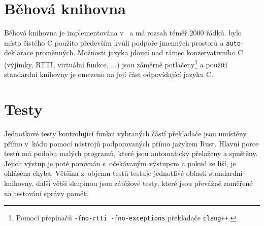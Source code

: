 \section{Běhová knihovna}

Běhová knihovna je implementována v~\Cplusplus{} a má rozsah téměř 2000 řádků.
\Cplusplus{} bylo místo čistého C použito především kvůli podpoře jmenných
prostorů a \texttt{auto}-deklarace proměnných. Možnosti jazyka jdoucí nad rámec
konzervativního C (výjimky, RTTI, virtuální funkce, ...) jsou záměrně
potlačeny\footnote{Pomocí přepínačů \texttt{-fno-rtti -fno-exceptions}
překladače \texttt{clang++}.} a použití standardní knihovny je omezeno na její
část odpovídající jazyku C.

\section{Testy}

Jednotkové testy kontrolující funkci vybraných částí překladače jsou umístěny
přímo v~kódu pomocí nástrojů podporovaných přímo jazykem Rust. Hlavní porce
testů má podobu malých programů, které jsou automaticky přeloženy a spuštěny.
Jejich výstup je poté porovnán s~očekávaným výstupem a pokud se liší, je
ohlášena chyba. Většina z~objemu testů testuje jednotlivé oblasti standardní
knihovny, další větši skupinou jsou zátěžové testy, které jsou převážně zaměřené
na testování správy paměti.
